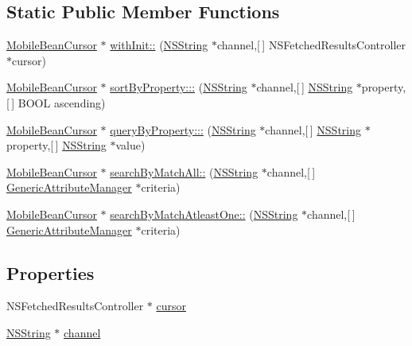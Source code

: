 \subsection*{\-Static \-Public \-Member \-Functions}
\begin{DoxyCompactItemize}
\item 
\hyperlink{interface_mobile_bean_cursor}{\-Mobile\-Bean\-Cursor} $\ast$ \hyperlink{interface_mobile_bean_cursor_a43107ebeaa16a92f24bf0052487b1272}{with\-Init\-::} (\hyperlink{class_n_s_string}{\-N\-S\-String} $\ast$channel,\mbox{[}$\,$\mbox{]} \-N\-S\-Fetched\-Results\-Controller $\ast$cursor)
\item 
\hyperlink{interface_mobile_bean_cursor}{\-Mobile\-Bean\-Cursor} $\ast$ \hyperlink{interface_mobile_bean_cursor_aab6cf942b25387e564c2eacfc001f3cf}{sort\-By\-Property\-:::} (\hyperlink{class_n_s_string}{\-N\-S\-String} $\ast$channel,\mbox{[}$\,$\mbox{]} \hyperlink{class_n_s_string}{\-N\-S\-String} $\ast$property,\mbox{[}$\,$\mbox{]} \-B\-O\-O\-L ascending)
\item 
\hyperlink{interface_mobile_bean_cursor}{\-Mobile\-Bean\-Cursor} $\ast$ \hyperlink{interface_mobile_bean_cursor_abce262ad65c0f4ba2a1cb4a17b6d69f5}{query\-By\-Property\-:::} (\hyperlink{class_n_s_string}{\-N\-S\-String} $\ast$channel,\mbox{[}$\,$\mbox{]} \hyperlink{class_n_s_string}{\-N\-S\-String} $\ast$property,\mbox{[}$\,$\mbox{]} \hyperlink{class_n_s_string}{\-N\-S\-String} $\ast$value)
\item 
\hyperlink{interface_mobile_bean_cursor}{\-Mobile\-Bean\-Cursor} $\ast$ \hyperlink{interface_mobile_bean_cursor_ae454a3d5744b51e344ddd2f5da6deae7}{search\-By\-Match\-All\-::} (\hyperlink{class_n_s_string}{\-N\-S\-String} $\ast$channel,\mbox{[}$\,$\mbox{]} \hyperlink{interface_generic_attribute_manager}{\-Generic\-Attribute\-Manager} $\ast$criteria)
\item 
\hyperlink{interface_mobile_bean_cursor}{\-Mobile\-Bean\-Cursor} $\ast$ \hyperlink{interface_mobile_bean_cursor_a5ba5e2857b1db075172f89558ff67eb9}{search\-By\-Match\-Atleast\-One\-::} (\hyperlink{class_n_s_string}{\-N\-S\-String} $\ast$channel,\mbox{[}$\,$\mbox{]} \hyperlink{interface_generic_attribute_manager}{\-Generic\-Attribute\-Manager} $\ast$criteria)
\end{DoxyCompactItemize}
\subsection*{\-Properties}
\begin{DoxyCompactItemize}
\item 
\-N\-S\-Fetched\-Results\-Controller $\ast$ \hyperlink{interface_mobile_bean_cursor_ad75afcd00b815239375451381137afc1}{cursor}
\item 
\hyperlink{class_n_s_string}{\-N\-S\-String} $\ast$ \hyperlink{interface_mobile_bean_cursor_a692379f0fc80b2ebad054c538e5d7159}{channel}
\end{DoxyCompactItemize}



